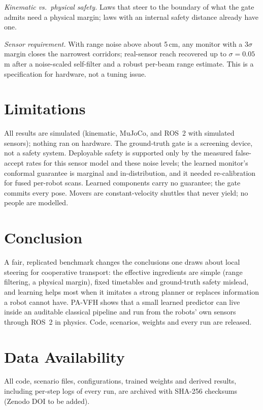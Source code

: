 \documentclass[journal]{IEEEtran}
\newcommand{\pavfh}{PA-VFH}
\begin{document}
\textit{Kinematic vs.\ physical safety.} Laws that steer to the boundary of
what the gate admits need a physical margin; laws with an internal safety
distance already have one.

\textit{Sensor requirement.} With range noise above about 5\,cm, any monitor
with a $3\sigma$ margin closes the narrowest corridors; real-sensor reach
recovered up to $\sigma=0.05$\,m after a noise-scaled self-filter and a robust
per-beam range estimate. This is a specification for hardware, not a tuning
issue.

\section{Limitations}
All results are simulated (kinematic, MuJoCo, and ROS~2 with simulated
sensors); nothing ran on hardware. The ground-truth gate is a screening device,
not a safety system. Deployable safety is supported only by the measured
false-accept rates for this sensor model and these noise levels; the learned
monitor's conformal guarantee is marginal and in-distribution, and it needed
re-calibration for fused per-robot scans. Learned components carry no
guarantee; the gate commits every pose. Movers are constant-velocity shuttles
that never yield; no people are modelled.

\section{Conclusion}
A fair, replicated benchmark changes the conclusions one draws about local
steering for cooperative transport: the effective ingredients are simple
(range filtering, a physical margin), fixed timetables and ground-truth safety
mislead, and learning helps most when it imitates a strong planner or replaces
information a robot cannot have. \pavfh{} shows that a small learned predictor
can live inside an auditable classical pipeline and run from the robots' own
sensors through ROS~2 in physics. Code, scenarios, weights and every run are
released.

\section*{Data Availability}
All code, scenario files, configurations, trained weights and derived results,
including per-step logs of every run, are archived with SHA-256 checksums
(Zenodo DOI to be added).



\end{document}
